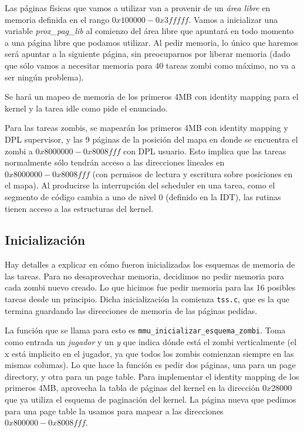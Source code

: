 \documentclass{article}
\begin{document}
	Las páginas físicas que vamos a utilizar van a provenir de un \textit{área libre} en memoria definida en el rango $0x100000 - 0x3fffff$. Vamos a inicializar una variable \textit{prox\_pag\_lib} al comienzo del área libre que apuntará en todo momento a una página libre que podamos utilizar. Al pedir memoria, lo único que haremos será apuntar a la siguiente página, sin preocuparnos por liberar memoria (dado que sólo vamos a necesitar memoria para $40$ tareas zombi como máximo, no va a ser ningún problema).

	Se hará un mapeo de memoria de los primeros 4MB con identity mapping para el kernel y la tarea idle como pide el enunciado.

	Para las tareas zombis, se mapearán los primeros 4MB con identity mapping y DPL supervisor, y las 9 páginas de la posición del mapa en donde se encuentra el zombi a $0x8000000 - 0x8008fff$ con DPL usuario. Esto implica que las tareas normalmente sólo tendrán acceso a las direcciones lineales en $0x8000000 - 0x8008fff$ (con permisos de lectura y escritura sobre posiciones en el mapa). Al producirse la interrupción del scheduler en una tarea, como el segmento de código cambia a uno de nivel 0 (definido en la IDT), las rutinas tienen acceso a las estructuras del kernel.

	\subsection*{Inicialización}

	Hay detalles a explicar en cómo fueron inicializadas los esquemas de memoria de las tareas. Para no desaprovechar memoria, decidimos no pedir memoria para cada zombi nuevo creado. Lo que hicimos fue pedir memoria para las 16 posibles tareas desde un principio. Dicha inicialización la comienza \texttt{tss.c}, que es la que termina guardando las direcciones de memoria de las páginas pedidas.

	La función que se llama para esto es \texttt{mmu\_inicializar\_esquema\_zombi}. Toma como entrada un \textit{jugador} y un \textit{y} que indica dónde está el zombi verticalmente (el x está implicito en el jugador, ya que todos los zombis comienzan siempre en las mismas columas). Lo que hace la función es pedir dos páginas, una para un page directory, y otra para un page table. Para implementar el identity mapping de los primeros 4MB, aprovecha la tabla de páginas del kernel en la dirección $0x28000$ que ya utiliza el esquema de paginación del kernel. La página nueva que pedimos para una page table la usamos para mapear a las direcciones $0x800000- 0x8008fff$.
\end{document}
